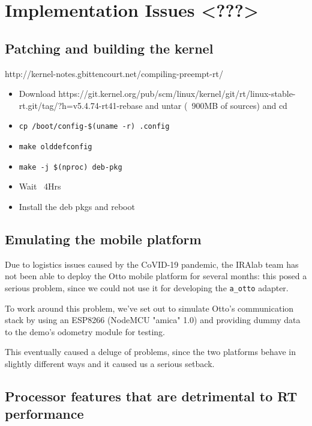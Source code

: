 \documentclass[a4paper,12pt]{report}
\begin{document}
\newpage
\chapter{Implementation Issues <???>}
\section{Patching and building the kernel}

http://kernel-notes.gbittencourt.net/compiling-preempt-rt/

\begin{itemize}
    \item Download https://git.kernel.org/pub/scm/linux/kernel/git/rt/linux-stable-rt.git/tag/?h=v5.4.74-rt41-rebase and untar (~900MB of sources) and cd
    \item \texttt{cp /boot/config-\$(uname -r) .config}
    \item \texttt{make olddefconfig}
    \item \texttt{make -j \$(nproc) deb-pkg}
    \item Wait ~4Hrs
    \item Install the deb pkgs and reboot
\end{itemize}

\section{Emulating the mobile platform}

Due to logistics issues caused by the CoVID-19 pandemic, the IRAlab team has not been able to deploy the Otto mobile platform for several months: this posed a serious problem, since we could not use it for developing the \texttt{a\_otto} adapter.

To work around this problem, we've set out to simulate Otto's communication stack by using an ESP8266 (NodeMCU "amica" 1.0) and providing dummy data to the demo's odometry module for testing. 

This eventually caused a deluge of problems, since the two platforms behave in slightly different ways and it caused us a serious setback.


\section{Processor features that are detrimental to RT performance}
\end{document}
